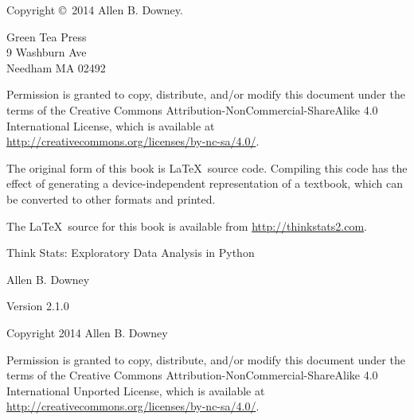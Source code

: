 \documentclass[12pt]{book}
\newcommand{\thetitle}{Think Stats}
\newcommand{\thesubtitle}{Exploratory Data Analysis in Python}
\newcommand{\theversion}{2.1.0}
\begin{document}
\begin{latexonly}
\begin{flushright}
\end{flushright}


\pagebreak
\thispagestyle{empty}

{\small
Copyright \copyright ~2014 Allen B. Downey.


\vspace{0.2in}

\begin{flushleft}
Green Tea Press       \\
9 Washburn Ave \\
Needham MA 02492
\end{flushleft}

Permission is granted to copy, distribute, and/or modify this document
under the terms of the Creative Commons
Attribution-NonCommercial-ShareAlike 4.0 International License, which
is available at
\url{http://creativecommons.org/licenses/by-nc-sa/4.0/}.

The original form of this book is \LaTeX\ source code.  Compiling this
code has the effect of generating a device-independent representation
of a textbook, which can be converted to other formats and printed.

The \LaTeX\ source for this book is available from
\url{http://thinkstats2.com}.

\vspace{0.2in}

} %

\end{latexonly}



\begin{htmlonly}


{\Large \thetitle: \thesubtitle}

{\large Allen B. Downey}

Version \theversion

\vspace{0.25in}

Copyright 2014 Allen B. Downey

\vspace{0.25in}

Permission is granted to copy, distribute, and/or modify this document
under the terms of the Creative Commons 
Attribution-NonCommercial-ShareAlike 4.0 International
Unported License, which is available at
\url{http://creativecommons.org/licenses/by-nc-sa/4.0/}.

\setcounter{chapter}{-1}

\end{htmlonly}
\end{document}
